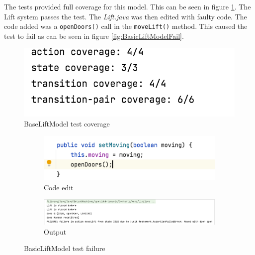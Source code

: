 \documentclass[a4paper, 12pt]{article}
\begin{document}
The tests provided full coverage for this model. This can be seen in figure \ref{fig:BaseLiftModel-coverage}. The Lift system passes the test. The \textit{Lift.java} was then edited with faulty code. The code added was a \texttt{openDoors()} call in the \texttt{moveLift()} method. This caused the test to fail as can be seen in figure \ref{fig:BasicLiftModelFail}.

\begin{figure}[h]
   \centering
   \includegraphics[width=\textwidth,height=\textheight,keepaspectratio]{images/BaseLiftModel-coverage} %
   \caption{BaseLiftModel test coverage}
   \label{fig:BaseLiftModel-coverage}
\end{figure}

\begin{figure}
\centering
\begin{subfigure}{.5\textwidth}
  \centering
  \includegraphics[width=\linewidth]{images/BasicLiftModel-fail-code}
  \caption{Code edit}
\end{subfigure}%
\begin{subfigure}{.5\textwidth}
  \centering
  \includegraphics[width=\linewidth]{images/BasicLiftModel-fail-output}
  \caption{Output}
\end{subfigure}
\caption{BasicLiftModel test failure}
\label{fig:BasicLiftModel-fail}
\end{figure}
\end{document}
